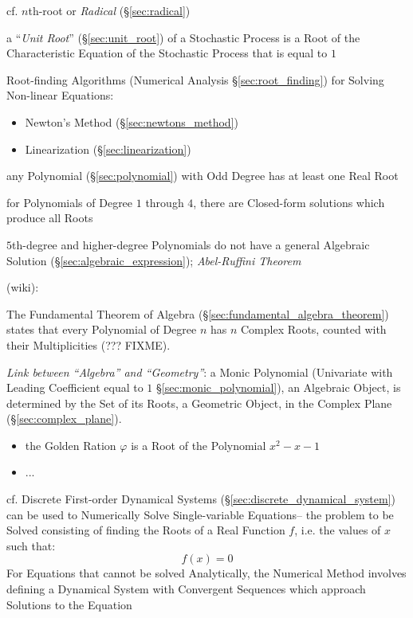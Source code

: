 {\fist cf. $n$th-root or \emph{Radical} (\S\ref{sec:radical})

\fist a ``\emph{Unit Root}'' (\S\ref{sec:unit_root}) of a Stochastic Process is
a Root of the Characteristic Equation of the Stochastic Process that is equal
to $1$

\fist Root-finding Algorithms (Numerical Analysis \S\ref{sec:root_finding}) for
Solving Non-linear Equations:
\begin{itemize}
  \item Newton's Method (\S\ref{sec:newtons_method})
  \item Linearization (\S\ref{sec:linearization})
\end{itemize}

any Polynomial (\S\ref{sec:polynomial}) with Odd Degree has at least one Real
Root

for Polynomials of Degree $1$ through $4$, there are Closed-form solutions which
produce all Roots

$5$th-degree and higher-degree Polynomials do not have a general Algebraic
Solution (\S\ref{sec:algebraic_expression}); \emph{Abel-Ruffini Theorem}

(wiki):

The Fundamental Theorem of Algebra (\S\ref{sec:fundamental_algebra_theorem})
states that every Polynomial of Degree $n$ has $n$ Complex Roots, counted with
their Multiplicities (??? FIXME).

\emph{Link between ``Algebra'' and ``Geometry''}: a Monic Polynomial
(Univariate with Leading Coefficient equal to $1$ \S\ref{sec:monic_polynomial}),
an Algebraic Object, is determined by the Set of its Roots, a Geometric Object,
in the Complex Plane (\S\ref{sec:complex_plane}).

\asterism

\begin{itemize}
  \item the Golden Ration $\varphi$ is a Root of the Polynomial $x^2 - x - 1$
  \item ...
\end{itemize}

\asterism

\fist cf. Discrete First-order Dynamical Systems
(\S\ref{sec:discrete_dynamical_system}) can be used to Numerically Solve
Single-variable Equations-- the problem to be Solved consisting of finding the
Roots of a Real Function $f$, i.e. the values of $x$ such that:
\[
  f(x) = 0
\]
For Equations that cannot be solved Analytically, the Numerical Method involves
defining a Dynamical System with Convergent Sequences which approach Solutions
to the Equation



}
